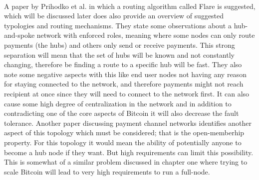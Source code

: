 \documentclass[informationsecurity]{gucmasterproject}
\begin{document}
\paragraph{} 
A paper by Prihodko et al. in which a routing algorithm called Flare\cite{prihodko2016flare} is suggested, which will be discussed later does also provide an overview of suggested typologies and routing mechanisms. They state some observations about a hub-and-spoke network with enforced roles, meaning where some nodes can only route payments (the hubs) and others only send or receive payments. This strong separation will mean that the set of hubs will be known and not constantly changing, therefore be finding a route to a specific hub will be fast. They also note some negative aspects with this like 
end user nodes not having any reason for staying connected to the network, and therefore payments might not reach recipient at once since they will need to connect to the network first. It can also cause some high degree of centralization in the network and in addition to contradicting one of the core aspects of Bitcoin it will also decrease the fault tolerance. Another paper discussing payment channel networks\cite{mccorry2016towards} identifies another aspect of this topology which must be considered; that is the open-memberhip property. For this topology it would mean the ability of potentially anyone to become a hub node if they want. But high requirements can limit this possibility. This is somewhat of a similar problem discussed in chapter one where trying to scale Bitcoin will lead to very high requirements to run a full-node.
\end{document}
